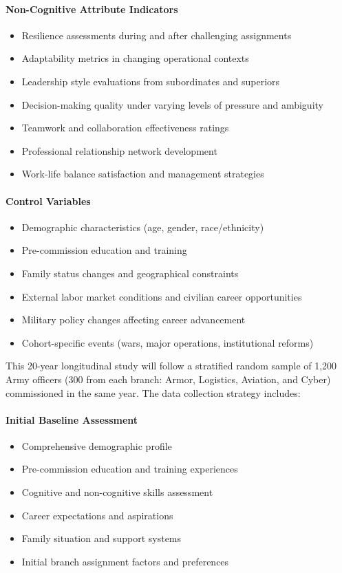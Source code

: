 \documentclass[../main.tex]{subfiles}
\begin{document}
\paragraph{Non-Cognitive Attribute Indicators}
\begin{itemize}
\item Resilience assessments during and after challenging assignments
\item Adaptability metrics in changing operational contexts
\item Leadership style evaluations from subordinates and superiors
\item Decision-making quality under varying levels of pressure and ambiguity
\item Teamwork and collaboration effectiveness ratings
\item Professional relationship network development
\item Work-life balance satisfaction and management strategies
\end{itemize}

\paragraph{Control Variables}
\begin{itemize}
\item Demographic characteristics (age, gender, race/ethnicity)
\item Pre-commission education and training
\item Family status changes and geographical constraints
\item External labor market conditions and civilian career opportunities
\item Military policy changes affecting career advancement
\item Cohort-specific events (wars, major operations, institutional reforms)
\end{itemize}


This 20-year longitudinal study will follow a stratified random sample of 1,200 Army officers (300 from each branch: Armor, Logistics, Aviation, and Cyber) commissioned in the same year. The data collection strategy includes:

\paragraph{Initial Baseline Assessment}
\begin{itemize}
\item Comprehensive demographic profile
\item Pre-commission education and training experiences
\item Cognitive and non-cognitive skills assessment
\item Career expectations and aspirations
\item Family situation and support systems
\item Initial branch assignment factors and preferences
\end{itemize}
\end{document}
